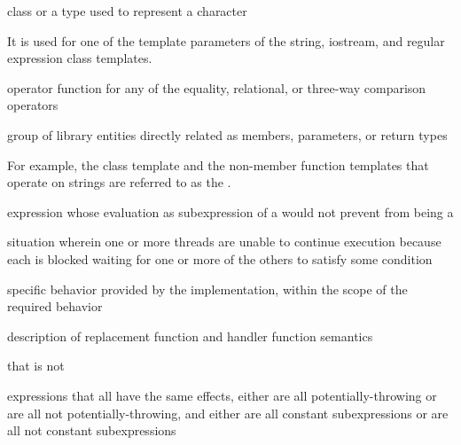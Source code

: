 %
class or a type used to
represent a character

\begin{defnote}
It is used for one of the template parameters of the string,
iostream, and regular expression class templates.
\end{defnote}

%
operator function for any of the
equality,
relational, or
three-way comparison
operators

%
group of library entities directly related as members, parameters, or
return types

\begin{defnote}
For example, the class template
and the non-member
function templates
that operate on
strings are referred to as the
.
\end{defnote}

%
expression whose evaluation as subexpression of a
 would not prevent 
from being a 

%
situation wherein
one or more threads are unable to continue execution because each is
blocked waiting for one or more of the others to satisfy some condition

%
specific behavior provided by the implementation,
within the scope of the required behavior

%
description of replacement function and handler function
semantics

%
that is not 

%
expressions that all have the same effects,
either
are all potentially-throwing or
are all not potentially-throwing,
and
either
are all constant subexpressions or
are all not constant subexpressions

